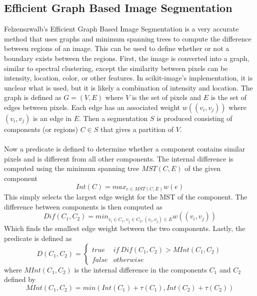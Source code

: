\documentclass[12pt]{extarticle}
\begin{document}
  \subsection{Efficient Graph Based Image Segmentation}
    Felzenszwalb's Efficient Graph Based Image Segmentation \cite{felzen} is a very accurate
    method that uses graphs and minimum spanning trees to compute the difference
    between regions of an image. This can be used to define whether or not a
    boundary exists between the regions. First, the image is converted into 
    a graph, similar to spectral clustering, except the similarity between
    pixels can be intensity, location, color, or other features. In scikit-image's
    implementation, it is unclear what is used, but it is likely a combination
    of intensity and location. The graph is defined as $G = (V,E)$ where
    $V$ is the set of pixels and $E$ is the set of edges between pixels.
    Each edge has an associated weight $w((v_i,v_j))$ where $(v_i,v_j)$ is an 
    edge in $E$. Then a segmentation $S$ is produced consisting of components
    (or regions) $C\in S$ that gives a partition of $V$.
    \\
    \\
    Now a predicate is defined to determine whether a component contains similar
    pixels and is different from all other components. The internal difference
    is computed using the minimum spanning tree $MST(C,E)$ of the given component
    \begin{equation}
      Int(C) = max_{e\in MST(C, E)} w(e)
    \end{equation}
    This simply selects the largest edge weight for the MST of the component.
    The difference between components is then computed as 
    \begin{equation}
      Dif(C_1,C_2) = min_{v_i\in C_1, v_j\in C_2, (v_i,v_j)\in E} w((v_i,v_j))
    \end{equation}
    Which finds the smallest edge weight between the two components.
    Lastly, the predicate is defined as
    \[ D(C_1,C_2) = \begin{cases} 
        true & if \: Dif(C_1,C_2) > MInt(C_1,C_2) \\
        false & otherwise
      \end{cases}
    \]
    where $MInt(C_1,C_2)$ is the internal difference in the components $C_1$
    and $C_2$ defined by
    \begin{equation}
      MInt(C_1,C_2) = min(Int(C_1)+\tau(C_1), Int(C_2)+\tau(C_2))
    \end{equation}
\end{document}
